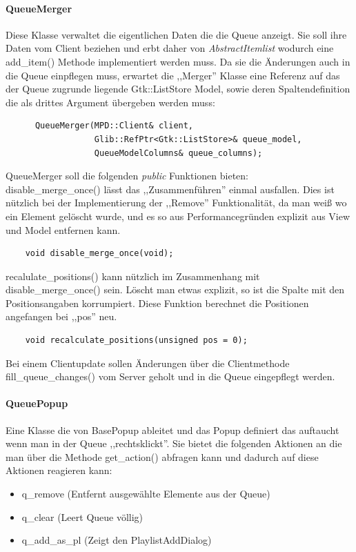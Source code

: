 \paragraph{QueueMerger}
Diese Klasse verwaltet die eigentlichen Daten die die Queue anzeigt.
Sie soll ihre Daten vom Client beziehen und erbt daher von \emph{AbstractItemlist} wodurch 
eine add\_item() Methode implementiert werden muss. Da sie die Änderungen auch in die Queue einpflegen muss, erwartet die ,,Merger'' Klasse eine Referenz auf das der Queue zugrunde liegende Gtk::ListStore Model, sowie deren Spaltendefinition die als drittes Argument übergeben werden muss:
\begin{verbatim}         
      QueueMerger(MPD::Client& client,
                  Glib::RefPtr<Gtk::ListStore>& queue_model,
                  QueueModelColumns& queue_columns);
\end{verbatim}

QueueMerger soll die folgenden \textit{public} Funktionen bieten:
\\
disable\_merge\_once() lässt das ,,Zusammenführen'' einmal ausfallen. Dies ist nützlich bei der Implementierung der ,,Remove'' Funktionalität,
da man weiß wo ein Element gelöscht wurde, und es so aus Performancegründen explizit aus View und Model entfernen kann.
\begin{verbatim}  
    void disable_merge_once(void);
\end{verbatim}
recalulate\_positions() kann nützlich im Zusammenhang mit disable\_merge\_once() sein. Löscht man etwas explizit, so ist die Spalte mit den Positionsangaben korrumpiert. Diese Funktion berechnet die Positionen angefangen bei ,,pos'' neu.
\begin{verbatim}        
    void recalculate_positions(unsigned pos = 0);
\end{verbatim}    

Bei einem Clientupdate sollen Änderungen über die Clientmethode fill\_queue\_changes() vom Server geholt und in die Queue eingepflegt werden. 


\paragraph{QueuePopup}
Eine Klasse die von BasePopup ableitet und das Popup definiert das auftaucht wenn man in der Queue ,,rechtsklickt''.
Sie bietet die folgenden Aktionen an die man über die Methode get\_action() abfragen kann und dadurch auf diese Aktionen reagieren kann:
\begin{itemize}
\item q\_remove (Entfernt ausgewählte Elemente aus der Queue)
\item q\_clear (Leert Queue völlig)
\item q\_add\_as\_pl (Zeigt den PlaylistAddDialog)
\end{itemize}

